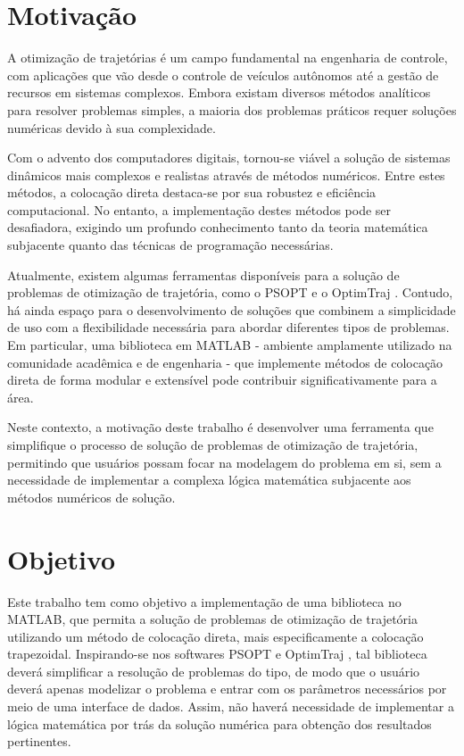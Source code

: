\section{Motivação}
\label{sec:motivação}

A otimização de trajetórias é um campo fundamental na engenharia de controle, com aplicações que vão desde o controle de veículos autônomos até a gestão de recursos em sistemas complexos. Embora existam diversos métodos analíticos para resolver problemas simples, a maioria dos problemas práticos requer soluções numéricas devido à sua complexidade.

Com o advento dos computadores digitais, tornou-se viável a solução de sistemas dinâmicos mais complexos e realistas através de métodos numéricos. Entre estes métodos, a colocação direta destaca-se por sua robustez e eficiência computacional. No entanto, a implementação destes métodos pode ser desafiadora, exigindo um profundo conhecimento tanto da teoria matemática subjacente quanto das técnicas de programação necessárias.

Atualmente, existem algumas ferramentas disponíveis para a solução de problemas de otimização de trajetória, como o PSOPT \cite{becerra_psopt_2022} e o OptimTraj \cite{kelly_optimtraj_2022}. Contudo, há ainda espaço para o desenvolvimento de soluções que combinem a simplicidade de uso com a flexibilidade necessária para abordar diferentes tipos de problemas. Em particular, uma biblioteca em MATLAB - ambiente amplamente utilizado na comunidade acadêmica e de engenharia - que implemente métodos de colocação direta de forma modular e extensível pode contribuir significativamente para a área.

Neste contexto, a motivação deste trabalho é desenvolver uma ferramenta que simplifique o processo de solução de problemas de otimização de trajetória, permitindo que usuários possam focar na modelagem do problema em si, sem a necessidade de implementar a complexa lógica matemática subjacente aos métodos numéricos de solução.


\section{Objetivo}
\label{sec:objetivo}

Este trabalho tem como objetivo a implementação de uma biblioteca no MATLAB, que permita a solução de problemas de otimização de trajetória utilizando um método de colocação direta, mais especificamente a colocação trapezoidal. Inspirando-se nos softwares PSOPT \cite{becerra_psopt_2022} e OptimTraj \cite{kelly_optimtraj_2022}, tal biblioteca deverá simplificar a resolução de problemas do tipo, de modo que o usuário deverá apenas modelizar o problema e entrar com os parâmetros necessários por meio de uma interface de dados. Assim, não haverá necessidade de implementar a lógica matemática por trás da solução numérica para obtenção dos resultados pertinentes.


